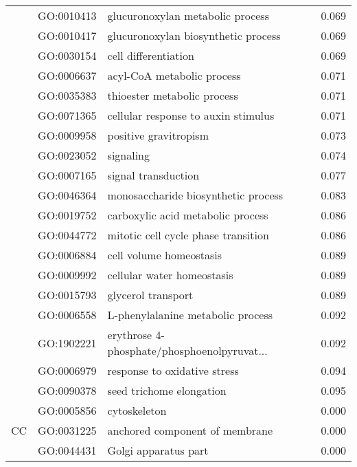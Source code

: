 \begin{longtable}{lllr}
   & GO:0010413 &             glucuronoxylan metabolic process &         0.069 \\
   & GO:0010417 &          glucuronoxylan biosynthetic process &         0.069 \\
   & GO:0030154 &                         cell differentiation &         0.069 \\
   & GO:0006637 &                   acyl-CoA metabolic process &         0.071 \\
   & GO:0035383 &                  thioester metabolic process &         0.071 \\
   & GO:0071365 &          cellular response to auxin stimulus &         0.071 \\
   & GO:0009958 &                        positive gravitropism &         0.073 \\
   & GO:0023052 &                                    signaling &         0.074 \\
   & GO:0007165 &                          signal transduction &         0.077 \\
   & GO:0046364 &          monosaccharide biosynthetic process &         0.083 \\
   & GO:0019752 &            carboxylic acid metabolic process &         0.086 \\
   & GO:0044772 &          mitotic cell cycle phase transition &         0.086 \\
   & GO:0006884 &                      cell volume homeostasis &         0.089 \\
   & GO:0009992 &                   cellular water homeostasis &         0.089 \\
   & GO:0015793 &                           glycerol transport &         0.089 \\
   & GO:0006558 &            L-phenylalanine metabolic process &         0.092 \\
   & GO:1902221 &  erythrose 4-phosphate/phosphoenolpyruvat... &         0.092 \\
   & GO:0006979 &                 response to oxidative stress &         0.094 \\
   & GO:0090378 &                     seed trichome elongation &         0.095 \\
\cline{1-4}
\multirow{30}{*}{CC} & GO:0005856 &                                 cytoskeleton &         0.000 \\
   & GO:0031225 &               anchored component of membrane &         0.000 \\
   & GO:0044431 &                         Golgi apparatus part &         0.000 \\

\end{longtable}
